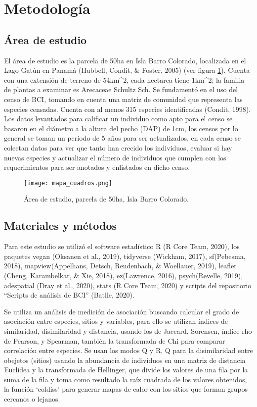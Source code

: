 \documentclass[11pt,]{article}
\begin{document}
\section{Metodología}\label{metodologuxeda}

\subsection{Área de estudio}\label{uxe1rea-de-estudio}

El área de estudio es la parcela de 50ha en Isla Barro Colorado,
localizada en el Lago Gatún en Panamá (Hubbell, Condit, \& Foster, 2005)
(ver figura \ref{fig:mapa_cuadros}). Cuenta con una extensión de terreno
de 54km\^{}2, cada hectarea tiene 1km\^{}2; la familia de plantas a
examinar es Arecaceae Schultz Sch. Se fundamentó en el uso del censo de
BCI, tomando en cuenta una matriz de comunidad que representa las
especies censadas. Cuenta con al menos 315 especies identificadas
(Condit, 1998). Los datos levantados para calificar un individuo como
apto para el censo se basaron en el diámetro a la altura del pecho (DAP)
de 1cm, los censos por lo general se toman un período de 5 años para ser
actualizados, en cada censo se colectan datos para ver que tanto han
crecido los individuos, evaluar si hay nuevas especies y actualizar el
número de individuos que cumplen con los requerimientos para ser
anotados y enlistados en dicho censo.

\begin{figure}
\centering
\texttt{[image: mapa\_cuadros.png]}
\caption{Área de estudio, parcela de 50ha, Isla Barro Colorado.
\label{fig:mapa_cuadros}}
\end{figure}

\subsection{Materiales y métodos}\label{materiales-y-muxe9todos}

Para este estudio se utilizó el software estadístico R (R Core Team,
2020), los paquetes vegan (Oksanen et al., 2019), tidyverse (Wickham,
2017), sf(Pebesma, 2018), mapview(Appelhans, Detsch, Reudenbach, \&
Woellauer, 2019), leaflet (Cheng, Karambelkar, \& Xie, 2018),
ez(Lawrence, 2016), psych(Revelle, 2019), adespatial (Dray et al.,
2020), stats (R Core Team, 2020) y scripts del repositorio ``Scripts de
análisis de BCI'' (Batlle, 2020).

Se utiliza un análisis de medición de asociación buscando calcular el
grado de asociación entre especies, sitios y variables, para ello se
utilizan índices de similaridad, disimilaridad y distancia, usando los
de Jaccard, Sorensen, índice rho de Pearson, y Spearman, también la
transformada de Chi para comparar correlación entre especies. Se usan
los modos Q y R, Q para la disimilaridad entre obejetos (sitios) usando
la abundancia de individuos en una matriz de distancia Euclídea y la
transformada de Hellinger, que divide los valores de una fila por la
suma de la fila y toma como resultado la raíz cuadrada de los valores
obtenidos, la función `coldiss' para generar mapas de calor con los
sitios que forman grupos cercanos o lejanos.
\end{document}
